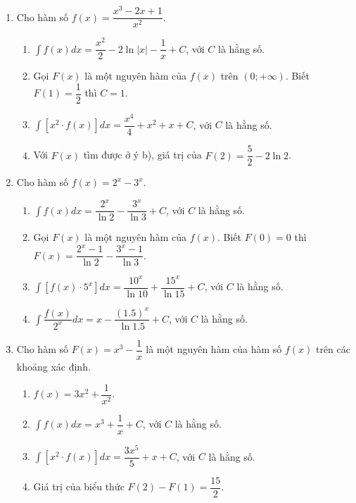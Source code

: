 \documentclass[12pt]{article}
\begin{document}
\begin{enumerate}[label=\textbf{Câu \arabic*.}, start=1]
		\item Cho hàm số $f(x) = \dfrac{x^3 - 2x + 1}{x^2}$.
		\begin{enumerate}[label=\alph*)]
			\item $\displaystyle \int f(x) dx = \dfrac{x^2}{2} - 2\ln|x| - \dfrac{1}{x} + C$, với $C$ là hằng số.
			\item Gọi $F(x)$ là một nguyên hàm của $f(x)$ trên $(0; +\infty)$. Biết $F(1) = \dfrac{1}{2}$ thì $C = 1$.
			\item $\displaystyle \int [x^2 \cdot f(x)] dx = \dfrac{x^4}{4} + x^2 + x + C$, với $C$ là hằng số.
			\item Với $F(x)$ tìm được ở ý b), giá trị của $F(2) = \dfrac{5}{2} - 2\ln 2$.
		\end{enumerate}
		
		\item Cho hàm số $f(x) = 2^x - 3^x$.
		\begin{enumerate}[label=\alph*)]
			\item $\displaystyle \int f(x) dx = \dfrac{2^x}{\ln 2} - \dfrac{3^x}{\ln 3} + C$, với $C$ là hằng số.
			\item Gọi $F(x)$ là một nguyên hàm của $f(x)$. Biết $F(0) = 0$ thì $F(x) = \dfrac{2^x - 1}{\ln 2} - \dfrac{3^x - 1}{\ln 3}$.
			\item $\displaystyle \int [f(x) \cdot 5^x] dx = \dfrac{10^x}{\ln 10} + \dfrac{15^x}{\ln 15} + C$, với $C$ là hằng số.
			\item $\displaystyle \int \dfrac{f(x)}{2^x} dx = x - \dfrac{(1.5)^x}{\ln 1.5} + C$, với $C$ là hằng số.
		\end{enumerate}
		
		\item Cho hàm số $F(x) = x^3 - \dfrac{1}{x}$ là một nguyên hàm của hàm số $f(x)$ trên các khoảng xác định.
		\begin{enumerate}[label=\alph*)]
			\item $f(x) = 3x^2 + \dfrac{1}{x^2}$.
			\item $\displaystyle \int f(x) dx = x^3 + \dfrac{1}{x} + C$, với $C$ là hằng số.
			\item $\displaystyle \int [x^2 \cdot f(x)] dx = \dfrac{3x^5}{5} + x + C$, với $C$ là hằng số.
			\item Giá trị của biểu thức $F(2) - F(1) = \dfrac{15}{2}$.
		\end{enumerate}
		

\end{enumerate}
\end{document}
